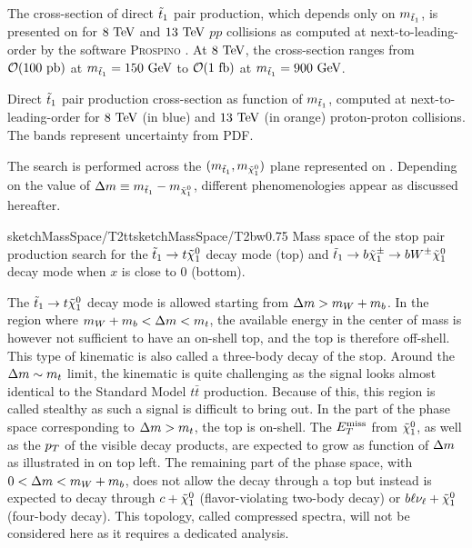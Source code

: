    The cross-section of direct $\tilde{t}_1$ pair production, which depends only on $m_{\tilde{t}_1}$,
    is presented on  for $8~\text{TeV}$ and $13~\text{TeV}$ $pp$ collisions
    as computed at next-to-leading-order by the software \textsc{Prospino} \cite{Prospino, Prospino2}.
    At $8~\text{TeV}$, the cross-section ranges from $\mathcal{O}(100~\text{pb})$ at $m_{\tilde{t}_1} =
    150~\text{GeV}$ to $\mathcal{O}(1~\text{fb})$ at $m_{\tilde{t}_1} = 900 ~\text{GeV}$.

    {Direct $\tilde{t}_1$ pair production cross-section as function of $m_{\tilde{t}_1}$, computed at next-to-leading-order
    for $8~\text{TeV}$ (in blue) and $13~\text{TeV}$ (in orange) proton-proton collisions. The bands represent uncertainty from PDF.}

    The search is performed across the $(m_{\tilde{t}_1},m_{\tilde{\chi}_1^0})$ plane
    represented on . Depending on the value of
    $\Delta m \equiv m_{\tilde{t}_1} - m_{\tilde{\chi}_1^0}$, different phenomenologies
    appear as discussed hereafter.

                 {sketchMassSpace/T2tt}{sketchMassSpace/T2bw}{0.75}
                 {Mass space of the stop pair production search for the $\tilde{t}_1
                 \rightarrow t \tilde{\chi}_1^0$ decay mode (top) and $\tilde{t}_1
                 \rightarrow b \tilde{\chi}_1^\pm \rightarrow b W^{\pm} \tilde{\chi}_1^0 $ decay
                 mode when $x$ is close to 0 (bottom).}

    The $\tilde{t}_1 \rightarrow t \tilde{\chi}_1^0$ decay mode is allowed starting from $\Delta m
    > m_{W} + m_{b}$. In the region where $m_{W} + m_{b} < \Delta m < m_{t}$,
    the available energy in the center of mass is however not sufficient to have an
    on-shell top, and the top is therefore off-shell. This type of kinematic is also
    called a three-body decay of the stop. Around the $\Delta m \sim m_{t}$ limit,
    the kinematic is quite challenging as the signal looks almost identical to
    the Standard Model $t\bar{t}$ production. Because of this, this region is called
    stealthy as such a signal is difficult to bring out. In the part of the phase space
    corresponding to $\Delta m > m_{t}$, the top is on-shell. The $E_T^\text{miss}$ from $\tilde{\chi}_1^0$,
    as well as the $p_T$ of the visible decay products, are expected to grow as function of
    $\Delta m$ as illustrated in  on top left. The remaining
    part of the phase space, with $0 < \Delta m < m_{W} + m_{b}$, does not allow
    the decay through a top but instead is expected to decay through $c+\tilde{\chi}_1^0$
    (flavor-violating two-body decay) or $b\ell\nu_\ell+\tilde{\chi}_1^0$ (four-body decay).
    This topology, called compressed spectra, will not be considered here as it requires
    a dedicated analysis.


